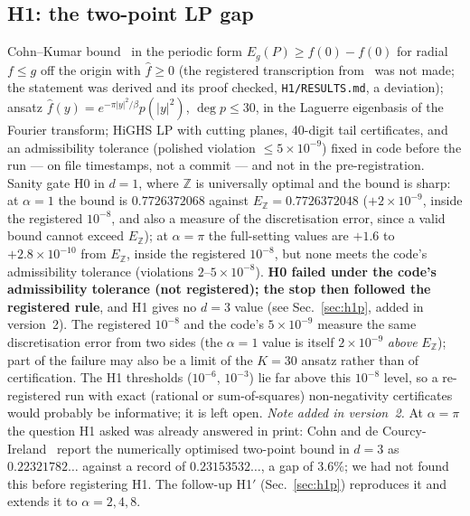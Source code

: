 \subsection{H1: the two-point LP gap}
Cohn--Kumar bound~\cite{CK07} in the periodic form $E_g(P)\ge\hat f(0)-f(0)$ for radial $f\le g$ off the origin with $\hat f\ge0$ (the registered transcription from~\cite{CK07} was not made; the statement
was derived and its proof checked, \texttt{H1/RESULTS.md}, a deviation); ansatz $\hat f(y)=e^{-\pi|y|^2/\beta}p(|y|^2)$, $\deg p\le30$, in the Laguerre eigenbasis
of the Fourier transform; HiGHS LP with cutting planes, 40-digit tail certificates, and an admissibility tolerance (polished violation
$\le5\times10^{-9}$) fixed in code before the run --- on file timestamps, not a commit --- and not in the pre-registration. Sanity gate H0 in $d=1$, where $\mathbb Z$ is universally optimal and the bound is sharp:
at $\alpha=1$ the bound is $0.7726372068$ against $E_{\mathbb Z}=0.7726372048$ ($+2\times10^{-9}$, inside the registered $10^{-8}$,
and also a measure of the discretisation error, since a valid bound cannot exceed $E_{\mathbb Z}$); at $\alpha=\pi$ the
full-setting values are $+1.6$ to $+2.8\times10^{-10}$ from $E_{\mathbb Z}$, inside the registered $10^{-8}$, but none meets the
code's admissibility tolerance (violations $2$--$5\times10^{-8}$). \textbf{H0 failed under the code's admissibility tolerance
(not registered); the stop then followed the registered rule}, and H1 gives no $d=3$ value (see Sec.~\ref{sec:h1p}, added in version~2). The registered
$10^{-8}$ and the code's $5\times10^{-9}$ measure the same discretisation error from two sides (the $\alpha=1$ value is itself
$2\times10^{-9}$ \emph{above} $E_{\mathbb Z}$); part of the failure may also be a limit of the $K=30$ ansatz rather than of
certification. The H1
thresholds ($10^{-6}$, $10^{-3}$) lie far above this $10^{-8}$ level, so a re-registered run with exact (rational or
sum-of-squares) non-negativity certificates would probably be informative; it is left open. \emph{Note added in version~2.} At $\alpha=\pi$ the question H1 asked
was already answered in print: Cohn and de Courcy-Ireland~\cite{CdCI16} report the numerically optimised two-point bound in
$d=3$ as $0.22321782\ldots$ against a record of $0.23153532\ldots$, a gap of $3.6\%$; we had not found this before
registering H1. The follow-up H1$'$ (Sec.~\ref{sec:h1p}) reproduces it and extends it to $\alpha=2,4,8$.

